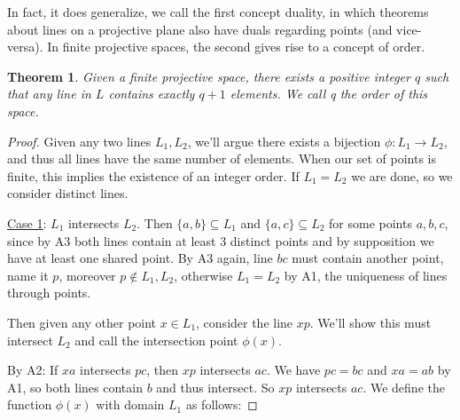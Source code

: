 \documentclass[12pt]{article}
\newtheorem{theorem}{Theorem}
\begin{document}
    In fact, it does generalize, we call the first concept duality,
    in which theorems about lines on a projective plane also have duals regarding points (and vice-versa).
    In finite projective spaces, the second gives rise to a concept of order\cite[p. 24]{beutelspacher_projective_1998}.

    \begin{theorem}
        Given a finite projective space, there exists a positive integer $q$ such that any line in $L$ contains exactly $q+1$ elements.
        We call q the order of this space.
    \end{theorem}

    \begin{proof}
        Given any two lines $L_1, L_2$, we'll argue there exists a bijection $\phi: L_1 \rightarrow L_2$,
        and thus all lines have the same number of elements.
        When our set of points is finite, this implies the existence of an integer order.
        If $L_1 = L_2$ we are done, so we consider distinct lines.

        \underline{Case 1}: $L_1$ intersects $L_2$.
        Then $\{a, b\} \subseteq L_1$ and $\{a, c\} \subseteq L_2$ for some points $a,b,c$,
        since by A3 both lines contain at least 3 distinct points and by supposition we have at least one shared point.
        By A3 again, line $bc$ must contain another point, name it $p$, moreover $p \notin L_1, L_2$,
        otherwise $L_1 = L_2$ by A1, the uniqueness of lines through points.

        Then given any other point $x \in L_1$, consider the line $xp$.
        We'll show this must intersect $L_2$ and call the intersection point $\phi(x)$.

        \begin{figure}[h]
            \centering
            \label{fig:intersecting_lines}
        \end{figure}
        By A2: If $xa$ intersects $pc$, then $xp$ intersects $ac$.
        We have $pc=bc$ and $xa = ab$ by A1, so both lines contain $b$ and thus intersect.
        So $xp$ intersects $ac$.
        We define the function $\phi(x)$ with domain $L_1$ as follows:


\end{proof}
\end{document}
